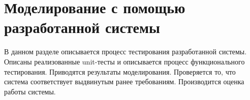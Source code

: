 




\section{Моделирование с помощью разработанной системы}
\begin{annotation}
	В данном разделе описывается процесс тестирования разработанной системы.
	Описаны реализованные unit-тесты и описывается процесс функционального тестирования.
	Приводятся результаты моделирования. Проверяется то, что система соответствует выдвинутым ранее требованиям.
	Производится оценка работы системы.
\end{annotation}





